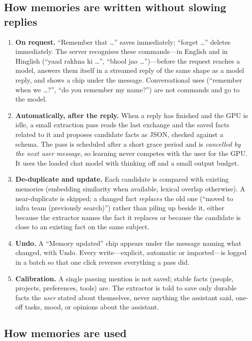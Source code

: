 \subsection{How memories are written without slowing replies}

\begin{enumerate}
\item \textbf{On request.} ``Remember that \dots'' saves immediately; ``forget \dots'' deletes immediately. The server recognises these commands---in English and in Hinglish (``yaad rakhna ki \dots'', ``bhool jao \dots'')---before the request reaches a model, answers them itself in a streamed reply of the same shape as a model reply, and shows a chip under the message. Conversational uses (``remember when we \dots?'', ``do you remember my name?'') are not commands and go to the model.
\item \textbf{Automatically, after the reply.} When a reply has finished and the GPU is idle, a small extraction pass reads the last exchange and the saved facts related to it and proposes candidate facts as JSON, checked against a schema. The pass is scheduled after a short grace period and is \emph{cancelled by the next user message}, so learning never competes with the user for the GPU. It uses the loaded chat model with thinking off and a small output budget.
\item \textbf{De-duplicate and update.} Each candidate is compared with existing memories (embedding similarity when available, lexical overlap otherwise). A near-duplicate is skipped; a changed fact \emph{replaces} the old one (``moved to infra team (previously search)'') rather than piling up beside it, either because the extractor names the fact it replaces or because the candidate is close to an existing fact on the same subject.
\item \textbf{Undo.} A ``Memory updated'' chip appears under the message naming what changed, with Undo. Every write---explicit, automatic or imported---is logged in a batch so that one click reverses everything a pass did.
\item \textbf{Calibration.} A single passing mention is not saved; stable facts (people, projects, preferences, tools) are. The extractor is told to save only durable facts the \emph{user} stated about themselves, never anything the assistant said, one-off tasks, mood, or opinions about the assistant.
\end{enumerate}

\subsection{How memories are used}

